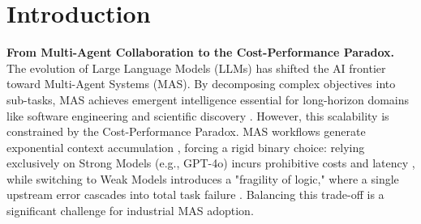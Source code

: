 \documentclass{article}
\theoremstyle{plain}
\theoremstyle{definition}
\theoremstyle{remark}
\begin{document}

\printAffiliationsAndNotice{}  %

\begin{abstract}

Graph-based Multi-Agent Systems (MAS) enable complex cyclic workflows but suffer from inefficient static model allocation, where deploying strong models uniformly wastes computation on trivial sub-tasks. We propose CASTER (\textbf{C}ontext-\textbf{A}ware \textbf{S}trategy for \textbf{T}ask \textbf{E}fficient \textbf{R}outing), a lightweight router for dynamic model selection in graph-based MAS. CASTER employs a Dual-Signal Router that combines semantic embeddings with structural meta-features to estimate task difficulty. During training, the router self-optimizes through a Cold Start to Iterative Evolution paradigm, learning from its own routing failures via on-policy negative feedback. Experiments using LLM-as-a-Judge evaluation across Software Engineering, Data Analysis, Scientific Discovery, and Cybersecurity demonstrate that CASTER reduces inference cost by up to \textbf{72.4\%} compared to strong-model baselines while matching their success rates, and consistently outperforms both heuristic routing and FrugalGPT across all domains.
\end{abstract}

\section{Introduction}

\textbf{From Multi-Agent Collaboration to the Cost-Performance Paradox.} The evolution of Large Language Models (LLMs) has shifted the AI frontier toward Multi-Agent Systems (MAS). By decomposing complex objectives into sub-tasks, MAS achieves emergent intelligence essential for long-horizon domains like software engineering \cite{hong2023metagpt} and scientific discovery \cite{zhou2024hypothesis}. However, this scalability is constrained by the Cost-Performance Paradox. MAS workflows generate exponential context accumulation \cite{packer2023memgpt}, forcing a rigid binary choice: relying exclusively on Strong Models (e.g., GPT-4o) incurs prohibitive costs and latency \cite{chen2023frugalgpt}, while switching to Weak Models introduces a "fragility of logic," where a single upstream error cascades into total task failure \cite{yao2022react}. Balancing this trade-off is a significant challenge for industrial MAS adoption.
\end{document}

